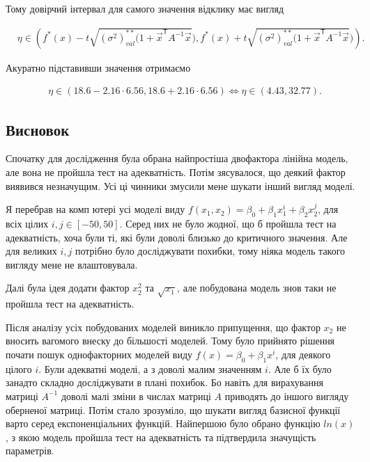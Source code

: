 \documentclass[14pt,a4paper]{scrartcl}
\theoremstyle{definition}
\theoremstyle{remark}
\theoremstyle{definition}
\theoremstyle{definition}
\begin{document}
Тому довірчий інтервал для самого значення відклику має вигляд

\begin{align*}
  & \eta \in \left( f^{*}(x) - t\sqrt{(\sigma^2)^{**}_{val} (1 + \vec{x}^\mathsf{T} A^{-1} \vec{x}}), f^{*}(x) + t\sqrt{(\sigma^2)^{**}_{val} (1 + \vec{x}^\mathsf{T} A^{-1} \vec{x}})  \right).
\end{align*}

Акуратно підставивши значення отримаємо

\begin{align*}
  & \eta \in \left( 18.6 - 2.16 \cdot 6.56, 18.6 + 2.16 \cdot 6.56  \right) \Leftrightarrow \eta \in \left( 4.43, 32.77  \right).
\end{align*}

\subsection{Висновок}

Спочатку для дослідження була обрана найпростіша двофактора лінійна модель, але вона не пройшла тест на адекватність. Потім з\textquotesingle ясувалося, що деякий фактор виявився незначущим. Усі ці чинники змусили мене шукати інший вигляд моделі.

Я перебрав на комп \textquotesingle ютері усі моделі виду $f(x_{1}, x_{2}) = \beta_{0} + \beta_{1} x_{1}^{i} + \beta_{2} x_{2}^{j}$, для всіх цілих $i, j \in [-50, 50]$. Серед них не було жодної, що б пройшла тест на адекватність, хоча були ті, які були доволі близько до критичного значення. Але для великих $i, j$ потрібно було досліджувати похибки, тому ніяка модель такого вигляду мене не влаштовувала.

Далі була ідея додати фактор $x_{2}^{2}$ та $\sqrt{x_{1}}$, але побудована модель знов таки не пройшла тест на адекватність.

Після аналізу усіх побудованих моделей виникло припущення, що фактор $x_{2}$ не вносить вагомого внеску до більшості моделей. Тому було прийнято рішення почати пошук однофакторних моделей виду $f(x) = \beta_{0} + \beta_{1} x^{i}$, для деякого цілого $i$. Були адекватні моделі, а з доволі малим значенням $i$. Але б їх було занадто складно досліджувати в плані похибок. Бо навіть для вирахування матриці $A^{-1}$ доволі малі зміни в числах матриці $A$ приводять до іншого вигляду оберненої матриці. Потім стало зрозуміло, що шукати вигляд базисної функції варто серед експоненціальних функцій. Найпершою було обрано функцію $ln(x)$, з якою модель пройшла тест на адекватність та підтвердила значущість параметрів.

\nocite{*}


%
\end{document}
